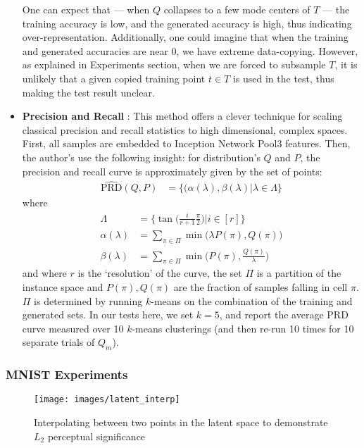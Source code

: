 \begin{itemize}
    One can expect that --- when $Q$ collapses to a few mode centers of $T$ --- the training accuracy is low, and the generated accuracy is high, thus indicating over-representation. Additionally, one could imagine that when the training and generated accuracies are near 0, we have extreme data-copying. However, as explained in Experiments section, when we are forced to subsample $T$, it is unlikely that a given copied training point $t \in T$ is used in the test, thus making the test result unclear. 
    \item \textbf{Precision and Recall} \citep{mehdi}: This method offers a clever technique for scaling classical precision and recall statistics to high dimensional, complex spaces. First, all samples are embedded to Inception Network Pool3 features. Then, the author's use the following insight: for distribution's $Q$ and $P$, the precision and recall curve is approximately given by the set of points: 
    \begin{align*}
        \widehat{\text{PRD}}(Q,P) &= \{(\alpha(\lambda), \beta(\lambda) | \lambda \in \Lambda \}
    \end{align*}
    where
    \begin{align*}
        \Lambda &= \{ \tan\big( \frac{i}{r + 1} \frac{\pi}{2} \big) | i \in [r] \} \\
        \alpha(\lambda) &= \sum_{\pi \in \Pi} \min \big( \lambda P(\pi), Q(\pi) \big) \\
        \beta(\lambda) &= \sum_{\pi \in \Pi} \min \big( P(\pi), \frac{Q(\pi)}{\lambda} \big) 
    \end{align*}
    and where $r$ is the `resolution' of the curve, the set $\Pi$ is a partition of the instance space and $P(\pi), Q(\pi)$ are the fraction of samples falling in cell $\pi$. $\Pi$ is determined by running $k$-means on the combination of the training and generated sets. In our tests here, we set $k = 5$, and report the average PRD curve measured over 10 $k$-means clusterings (and then re-run 10 times for 10 separate trials of $Q_m$). 
    
    \end{itemize}

\subsubsection{MNIST Experiments}
\label{sec:appendix MNIST autoencoder}
\begin{figure*}[h]
	\centering
	\texttt{[image: images/latent\_interp]}
	\caption{Interpolating between two points in the latent space to demonstrate $L_2$ perceptual significance}
	\label{fig:latent_interp}
\end{figure*}

